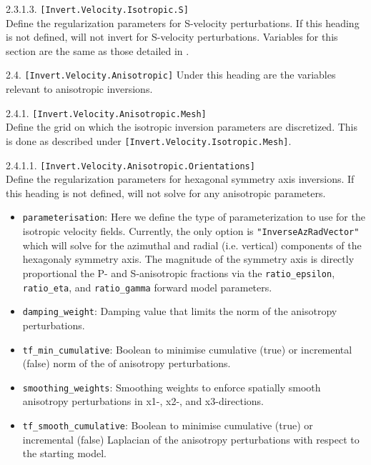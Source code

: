 2.3.1.3. \texttt{[Invert.Velocity.Isotropic.S]}\\
Define the regularization parameters for S-velocity perturbations. If this heading is not defined, will not invert for S-velocity perturbations. Variables for this section are the same as those detailed in .

2.4. \texttt{[Invert.Velocity.Anisotropic]}
Under this heading are the variables relevant to anisotropic inversions.

2.4.1. \texttt{[Invert.Velocity.Anisotropic.Mesh]}\\
Define the grid on which the isotropic inversion parameters are discretized. This is done as described under \texttt{[Invert.Velocity.Isotropic.Mesh]}.

2.4.1.1. \texttt{[Invert.Velocity.Anisotropic.Orientations]}\\
Define the regularization parameters for hexagonal symmetry axis inversions. If this heading is not defined, will not solve for any anisotropic parameters.
\begin{itemize}
    \item \texttt{parameterisation}: Here we define the type of parameterization to use for the isotropic velocity fields. Currently, the only option is \texttt{"InverseAzRadVector"} which will solve for the azimuthal and radial (i.e. vertical) components of the hexagonaly symmetry axis. The magnitude of the symmetry axis is directly proportional the P- and S-anisotropic fractions via the \texttt{ratio\_epsilon}, \texttt{ratio\_eta}, and \texttt{ratio\_gamma} forward model parameters.
    \item \texttt{damping\_weight}: Damping value that limits the norm of the anisotropy perturbations.
    \item \texttt{tf\_min\_cumulative}: Boolean to minimise cumulative (true) or incremental (false) norm of the of anisotropy perturbations.
    \item \texttt{smoothing\_weights}: Smoothing weights to enforce spatially smooth anisotropy perturbations in x1-, x2-, and x3-directions.
    \item \texttt{tf\_smooth\_cumulative}: Boolean to minimise cumulative (true) or incremental (false) Laplacian of the anisotropy perturbations with respect to the starting model.
\end{itemize}

